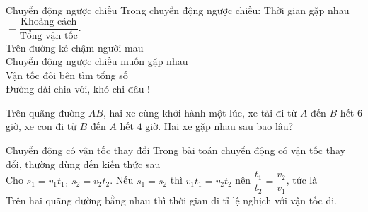 \begin{dang}{Chuyển động ngược chiều}
Trong chuyển động ngược chiều: Thời gian gặp nhau $=\dfrac{\text{Khoảng cách}}{\text{Tổng vận tốc}}$.\\
Trên đường kẻ chậm người mau\\
Chuyển động ngược chiều muốn gặp nhau\\
Vận tốc đôi bên tìm tổng số\\
Đường dài chia với, khó chi đâu !
\end{dang}
\begin{vd}
Trên quãng đường $AB$, hai xe cùng khởi hành một lúc, xe tải đi từ $A$ đến $B$ hết $6$ giờ, xe con đi từ $B$ đến $A$ hết $4$ giờ. Hai xe gặp nhau sau bao lâu?
\end{vd}
\begin{dang}{Chuyển động có vận tốc thay đổi }
Trong bài toán chuyển động có vận tốc thay đổi, thường dùng đến kiến thức sau\\
Cho $s_1=v_1t_1,~s_2=v_2t_2$. Nếu $s_1=s_2$ thì $v_1t_1=v_2t_2$ nên $\dfrac{t_1}{t_2}=\dfrac{v_2}{v_1}$, tức là\\
 Trên hai quãng đường bằng nhau thì thời gian đi tỉ lệ nghịch với vận tốc đi.
\end{dang}

